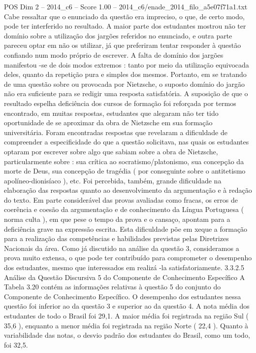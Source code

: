 \begin{textsample}{POS Dim 2 – 2014\_c6 – Score 1.00 – 2014\_c6/enade\_2014\_filo\_a5e07f71a1.txt}
Cabe ressaltar que o enunciado da questão era impreciso, o que, de certo modo, pode ter interferido no resultado.
A maior parte dos estudantes mostrou não ter domínio sobre a utilização dos jargões referidos no enunciado, e outra parte pareceu optar em não os utilizar, já que preferiram tentar responder à questão confiando num modo próprio de escrever.
A falta de domínio dos jargões manifestou -se de dois modos extremos : tanto por meio da utilização equivocada deles, quanto da repetição pura e simples dos mesmos.
Portanto, em se tratando de uma questão sobre ou provocada por Nietzsche, o suposto domínio do jargão não era suficiente para se redigir uma resposta satisfatória.
A suposição de que o resultado espelha deficiência dos cursos de formação foi reforçada por termos encontrado, em muitas respostas, estudantes que alegaram não ter tido oportunidade de se aproximar da obra de Nietzsche em sua formação universitária.
Foram encontradas respostas que revelaram a dificuldade de compreender a especificidade do que a questão solicitava, nas quais os estudantes optaram por escrever sobre algo que sabiam sobre a obra de Nietzsche, particularmente sobre : sua crítica ao socratismo/platonismo, sua concepção da morte de Deus, sua concepção de tragédia ( por conseguinte sobre o antitetismo apolíneo-dionisíaco ), etc.
Foi percebida, também, grande dificuldade na elaboração das respostas quanto ao desenvolvimento da argumentação e à redação do texto.
Em parte considerável das provas avaliadas como fracas, os erros de coerência e coesão da argumentação e de conhecimento da Língua Portuguesa ( norma culta ), em que pese o tempo da prova e o cansaço, apontam para a deficiência grave na expressão escrita.
Esta dificuldade põe em xeque a formação para a realização das competências e habilidades previstas pelas Diretrizes Nacionais da área.
Como já discutido na análise da questão 3, consideramos a prova muito extensa, o que pode ter contribuído para comprometer o desempenho dos estudantes, mesmo que interessados em realizá -la satisfatoriamente. 3.3.2.5 Análise da Questão Discursiva 5 do Componente de Conhecimento Específico A Tabela 3.20 contém as informações relativas à questão 5 do conjunto do Componente de Conhecimento Específico.
O desempenho dos estudantes nessa questão foi inferior ao da questão 3 e superior ao da questão 4.
A nota média dos estudantes de todo o Brasil foi 29,1.
A maior média foi registrada na região Sul ( 35,6 ), enquanto a menor média foi registrada na região Norte ( 22,4 ).
Quanto à variabilidade das notas, o desvio padrão dos estudantes do Brasil, como um todo, foi 32,5.

\end{textsample}
